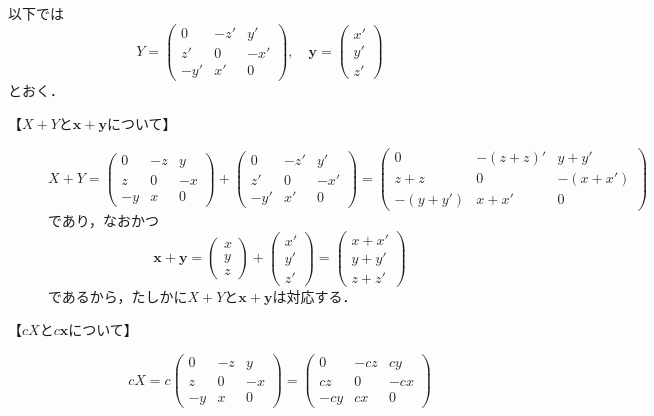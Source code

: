 \begin{tproof}
  以下では
  \[
    Y = \begin{pmatrix} 0 & -z ' & y ' \\ z' & 0 & -x' \\ -y' & x ' & 0 \end{pmatrix},\quad \bm{y} = \begin{pmatrix} x' \\ y ' \\ z ' \end{pmatrix}
  \]
  とおく．
  \begin{description}
    \item[【$X+Y$と$\bm{x}+\bm{y}$について】]
          \[
            X + Y  = \begin{pmatrix} 0 & -z & y \\ z & 0 & -x \\ -y & x & 0 \end{pmatrix}+ \begin{pmatrix} 0 & -z ' & y ' \\ z' & 0 & -x' \\ -y' & x ' & 0 \end{pmatrix} = \begin{pmatrix} 0 & -(z+z)' & y+y' \\ z+z & 0 & -(x+x') \\ -(y+y') & x+x' & 0 \end{pmatrix}
          \]
          であり，なおかつ
          \[
            \bm{x}+\bm{y} =\begin{pmatrix} x \\ y \\ z \end{pmatrix}+ \begin{pmatrix} x' \\ y' \\ z' \end{pmatrix} = \begin{pmatrix} x+x' \\ y+y' \\ z+z' \end{pmatrix}
          \]
          であるから，たしかに$X+Y$と$\bm{x}+\bm{y}$は対応する．
    \item[【$cX$と$c\bm{x}$について】]
          \[
            cX =c\begin{pmatrix} 0 & -z & y \\ z & 0 & -x \\ -y & x & 0 \end{pmatrix} =\begin{pmatrix} 0 & -cz & cy \\ cz & 0 & -cx \\ -cy & cx & 0 \end{pmatrix}
\]
\end{description}
\end{tproof}
